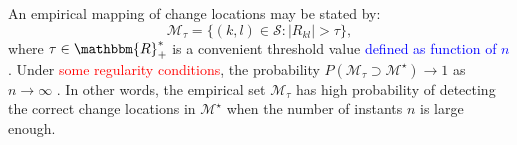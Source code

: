 \documentclass[journal]{IEEEtran}
\newcommand{\vX}{{\textbf X}}
\begin{document}
An empirical mapping of change locations may be stated by:
\begin{equation}
\mathcal{M}_{\tau} = \{(k,l) \in \mathcal{S} : |R_{kl}|>\tau\},
\label{E:def_Mtaud}
\end{equation}
where $\tau \in \mathbbm{R}_{+}^{*}$ is a convenient threshold value \textcolor{blue}{defined as function of $n$}. Under \textcolor{red}{some regularity conditions}, the probability $P(\mathcal{M}_{\tau}\supset\mathcal{M}^{\star}) \rightarrow 1$ as $n\rightarrow\infty$ \cite{fan2020statistical}. In other words, the empirical set $\mathcal{M}_{\tau}$ has high probability of detecting the correct change locations in $\mathcal{M}^{\star}$ when the number of instants $n$ is large enough. 



%
\end{document}
